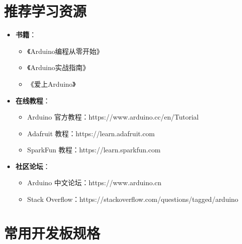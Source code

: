 \documentclass[12pt,UTF8]{ctexbook}
\begin{document}
\section{推荐学习资源}

\begin{itemize}
    \item \textbf{书籍}：
    \begin{itemize}
        \item 《Arduino编程从零开始》
        \item 《Arduino实战指南》
        \item 《爱上Arduino》
    \end{itemize}
    
    \item \textbf{在线教程}：
    \begin{itemize}
        \item Arduino 官方教程：https://www.arduino.cc/en/Tutorial
        \item Adafruit 教程：https://learn.adafruit.com
        \item SparkFun 教程：https://learn.sparkfun.com
    \end{itemize}
    
    \item \textbf{社区论坛}：
    \begin{itemize}
        \item Arduino 中文论坛：https://www.arduino.cn
        \item Stack Overflow：https://stackoverflow.com/questions/tagged/arduino
    \end{itemize}
\end{itemize}

\section{常用开发板规格}
\end{document}
